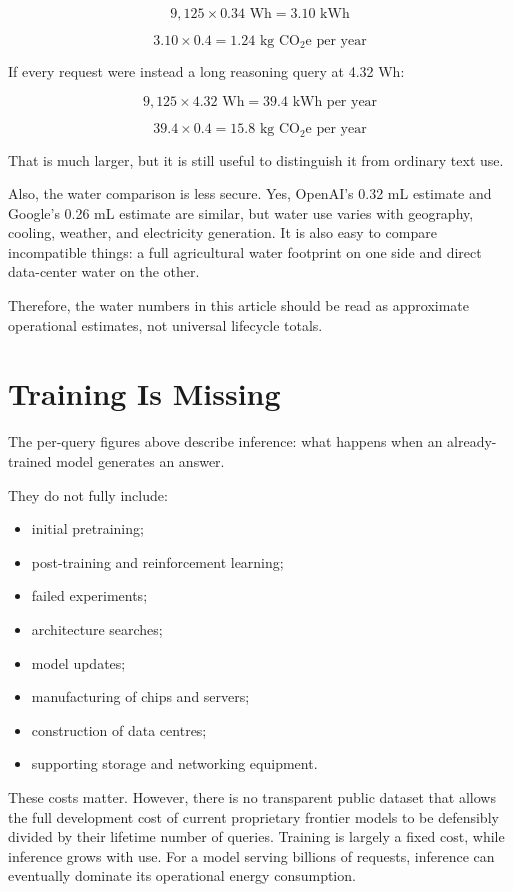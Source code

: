 \documentclass{article}
\begin{document}
\[
9{,}125 \times 0.34\text{ Wh}
=
3.10\text{ kWh}
\]

\[
3.10 \times 0.4
=
1.24\text{ kg CO$_2$e per year}
\]

If every request were instead a long reasoning query at 4.32 Wh:

\[
9{,}125 \times 4.32\text{ Wh}
=
39.4\text{ kWh per year}
\]

\[
39.4 \times 0.4
=
15.8\text{ kg CO$_2$e per year}
\]

That is much larger, but it is still useful to distinguish it from ordinary text use.

Also, the water comparison is less secure. Yes, OpenAI's 0.32 mL estimate and Google's 0.26 mL estimate are similar, but water use varies with geography, cooling, weather, and electricity generation. It is also easy to compare incompatible things: a full agricultural water footprint on one side and direct data-center water on the other.

Therefore, the water numbers in this article should be read as approximate operational estimates, not universal lifecycle totals.

\section*{Training Is Missing}

The per-query figures above describe inference: what happens when an already-trained model generates an answer.

They do not fully include:

\begin{itemize}[noitemsep]
    \item initial pretraining;
    \item post-training and reinforcement learning;
    \item failed experiments;
    \item architecture searches;
    \item model updates;
    \item manufacturing of chips and servers;
    \item construction of data centres;
    \item supporting storage and networking equipment.
\end{itemize}

These costs matter. However, there is no transparent public dataset that allows the full development cost of current proprietary frontier models to be defensibly divided by their lifetime number of queries. Training is largely a fixed cost, while inference grows with use. For a model serving billions of requests, inference can eventually dominate its operational energy consumption.
\end{document}
